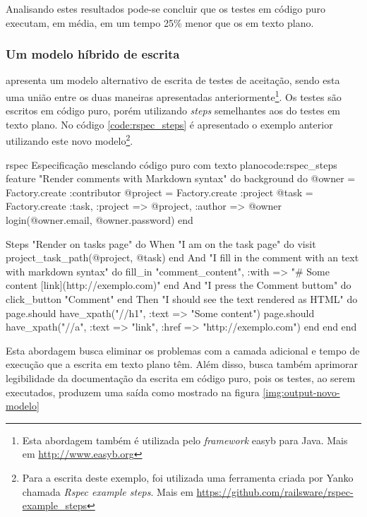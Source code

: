 Analisando estes resultados pode-se concluir que os testes em código puro executam, em média, em um tempo 25\% menor que os em texto plano.


\subsubsection{Um modelo híbrido de escrita}
\label{ssub:um_modelo_hibrido_de_escrita}

 apresenta um modelo alternativo de escrita de testes de aceitação, sendo esta uma união entre os duas maneiras apresentadas anteriormente\footnote{Esta abordagem também é utilizada pelo \textit{framework} easyb para Java. Mais em \url{http://www.easyb.org}}. Os testes são escritos em código puro, porém utilizando \textit{steps} semelhantes aos do testes em texto plano. No código \ref{code:rspec_steps} é apresentado o exemplo anterior utilizando este novo modelo\footnote{Para a escrita deste exemplo, foi utilizada uma ferramenta criada por Yanko chamada \textit{Rspec example steps}. Mais em \url{https://github.com/railsware/rspec-example_steps}}.

\begin{mycode}{rspec}%
{Especificação mesclando código puro com texto plano}{code:rspec_steps}
feature "Render comments with Markdown syntax" do
  background do
    @owner = Factory.create :contributor
    @project = Factory.create :project
    @task = Factory.create :task, :project => @project, :author => @owner
    login(@owner.email, @owner.password)
  end

  Steps "Render on tasks page" do
    When "I am on the task page" do
      visit project_task_path(@project, @task)
    end
    And "I fill in the comment with an text with markdown syntax" do
      fill_in "comment_content", :with => "# Some content [link](http://exemplo.com)"
    end
    And "I press the Comment buttom" do
      click_button "Comment"
    end
    Then "I should see the text rendered as HTML" do
      page.should have_xpath("//h1", :text => "Some content")
      page.should have_xpath("//a", :text => "link", :href => "http://exemplo.com")
    end
  end
end
\end{mycode}

Esta abordagem busca eliminar os problemas com a camada adicional e tempo de execução que a escrita em texto plano têm. Além disso, busca também aprimorar legibilidade da documentação da escrita em código puro, pois os testes, ao serem executados, produzem uma saída como mostrado na figura \ref{img:output-novo-modelo}

